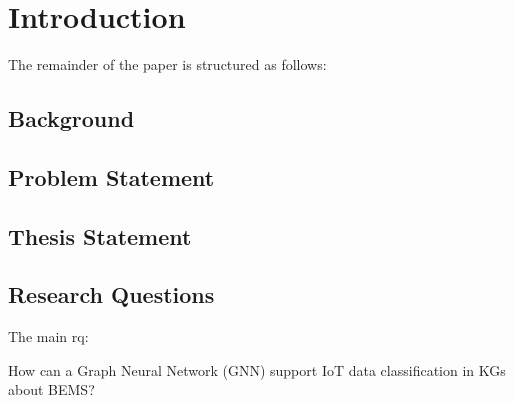 \chapter{Introduction}\label{chap:intro}
The remainder of the paper is structured as follows:
\section{Background}\label{sec:background}

\section{Problem Statement}\label{sec:problem-statement}

\section{Thesis Statement}\label{sec:thesis-statement}

\section{Research Questions}\label{sec:research-questions}
The main \gls{rq}:

How can a Graph Neural Network (GNN) support IoT data classification in KGs about BEMS?
